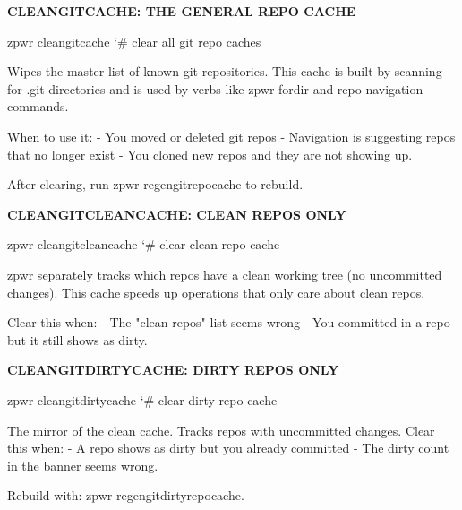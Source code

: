 \documentclass[11pt,a4paper,twoside]{book}
\begin{document}
\vspace{12pt}
{\bfseries\color{neonyellow} CLEANGITCACHE: THE GENERAL REPO CACHE}\vspace{4pt}

\begin{codebox}
\color{neongreen}zpwr cleangitcache                  {\char`\#} clear all git repo caches\\
\end{codebox}

Wipes the master list of known git repositories. This cache is built by scanning for .git directories and is used by verbs like zpwr fordir and repo navigation commands.

When to use it: - You moved or deleted git repos - Navigation is suggesting repos that no longer exist - You cloned new repos and they are not showing up.

After clearing, run zpwr regengitrepocache to rebuild.


\vspace{12pt}
{\bfseries\color{neonyellow} CLEANGITCLEANCACHE: CLEAN REPOS ONLY}\vspace{4pt}

\begin{codebox}
\color{neongreen}zpwr cleangitcleancache             {\char`\#} clear clean repo cache\\
\end{codebox}

zpwr separately tracks which repos have a clean working tree (no uncommitted changes). This cache speeds up operations that only care about clean repos.

Clear this when: - The "clean repos" list seems wrong - You committed in a repo but it still shows as dirty.


\vspace{12pt}
{\bfseries\color{neonyellow} CLEANGITDIRTYCACHE: DIRTY REPOS ONLY}\vspace{4pt}

\begin{codebox}
\color{neongreen}zpwr cleangitdirtycache             {\char`\#} clear dirty repo cache\\
\end{codebox}

The mirror of the clean cache. Tracks repos with uncommitted changes. Clear this when: - A repo shows as dirty but you already committed - The dirty count in the banner seems wrong.

Rebuild with: zpwr regengitdirtyrepocache.
\end{document}
